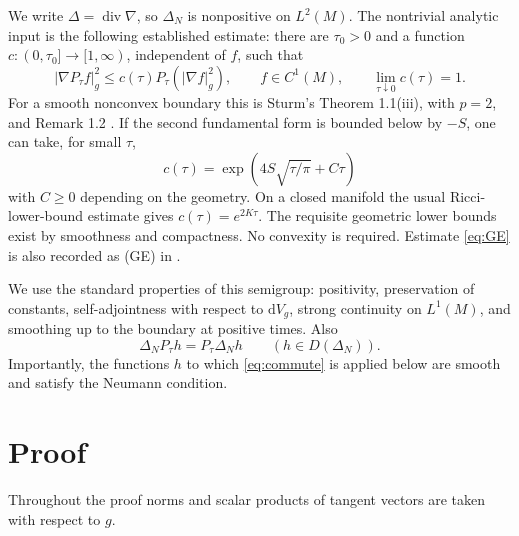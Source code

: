 \documentclass[11pt]{article}
\begin{document}
We write $\Delta=\operatorname{div}\nabla$, so $\Delta_N$ is nonpositive on $L^2(M)$. The nontrivial analytic input is the following established estimate: there are $\tau_0>0$ and a function $c:(0,\tau_0]\to[1,\infty)$, independent of $f$, such that
\begin{equation}\label{eq:GE}
 |\nabla P_\tau f|_g^2\leq c(\tau)P_\tau(|\nabla f|_g^2),
 \qquad f\in C^1(M),\qquad \lim_{\tau\downarrow0}c(\tau)=1.
\end{equation}
For a smooth nonconvex boundary this is Sturm's Theorem 1.1(iii), with $p=2$, and Remark 1.2 \cite{Sturm}. If the second fundamental form is bounded below by $-S$, one can take, for small $\tau$,
\[
 c(\tau)=\exp\!\left(4S\sqrt{\tau/\pi}+C\tau\right)
\]
with $C\geq0$ depending on the geometry. On a closed manifold the usual Ricci-lower-bound estimate gives $c(\tau)=e^{2K\tau}$. The requisite geometric lower bounds exist by smoothness and compactness. No convexity is required. Estimate \eqref{eq:GE} is also recorded as (GE) in \cite[Section 3]{CFM}.

We use the standard properties of this semigroup: positivity, preservation of constants, self-adjointness with respect to $\mathrm{d}V_g$, strong continuity on $L^1(M)$, and smoothing up to the boundary at positive times. Also
\begin{equation}\label{eq:commute}
 \Delta_N P_\tau h=P_\tau\Delta_N h\qquad (h\in D(\Delta_N)).
\end{equation}
Importantly, the functions $h$ to which \eqref{eq:commute} is applied below are smooth and satisfy the Neumann condition.

\section{Proof}
Throughout the proof norms and scalar products of tangent vectors are taken with respect to $g$.
\end{document}
